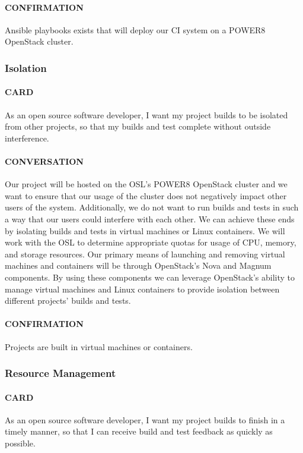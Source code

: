 \documentclass[10pt,letterpaper,onecolumn,draftclsnofoot]{IEEEtran}
\begin{document}
\paragraph{CONFIRMATION}
Ansible playbooks exists that will deploy our CI system on a POWER8 OpenStack cluster.

\subsubsection{Isolation}
\paragraph{CARD}
As an open source software developer, I want my project builds to be isolated from other projects, so that my builds and test complete without outside interference.
\paragraph{CONVERSATION}
Our project will be hosted on the OSL's POWER8 OpenStack cluster and we want to ensure that our usage of the cluster does not negatively impact other users of the system.
Additionally, we do not want to run builds and tests in such a way that our users could interfere with each other.
We can achieve these ends by isolating builds and tests in virtual machines or Linux containers.
We will work with the OSL to determine appropriate quotas for usage of CPU, memory, and storage resources.
Our primary means of launching and removing virtual machines and containers will be through OpenStack's Nova and Magnum components.
By using these components we can leverage OpenStack's ability to manage virtual machines and Linux containers to provide isolation between different projects' builds and tests.
\paragraph{CONFIRMATION}
Projects are built in virtual machines or containers.

\subsubsection{Resource Management}
\paragraph{CARD}
As an open source software developer, I want my project builds to finish in a timely manner, so that I can receive build and test feedback as quickly as possible.
\end{document}
